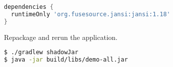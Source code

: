 \begin{enumerate}
\begin{itemize}
\begin{lstlisting}[language=Groovy]
dependencies {
  runtimeOnly 'org.fusesource.jansi:jansi:1.18'
}
\end{lstlisting}

\end{itemize}

Repackage and rerun the application.

\begin{lstlisting}[language=bash]
$ ./gradlew shadowJar
$ java -jar build/libs/demo-all.jar
\end{lstlisting}

\end{enumerate}
